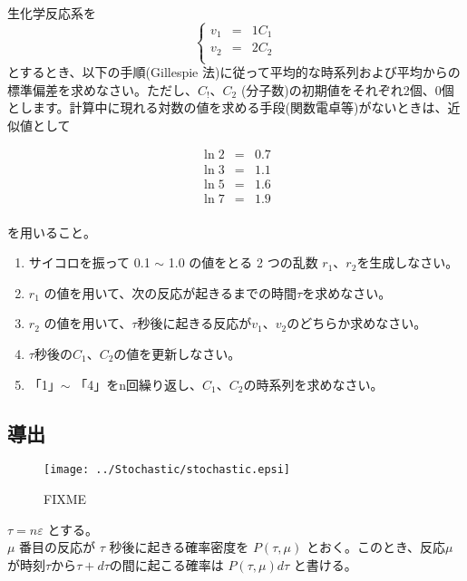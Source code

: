 生化学反応系を
\[\left\{
\begin{array}{lcl}
v_1 & = & 1 C_1 \\ 
v_2 & = & 2 C_2 \\ 
\end{array}
\right.\]
とするとき、以下の手順(Gillespie 法)に従って平均的な時系列および平均からの標準偏差を求めなさい。ただし、\(C_!\)、\(C_2\) (分子数)の初期値をそれぞれ2個、0個とします。計算中に現れる対数の値を求める手段(関数電卓等)がないときは、近似値として

\begin{eqnarray*}
\ln 2 & = & 0.7 \\
\ln 3 & = & 1.1 \\
\ln 5 & = & 1.6 \\
\ln 7 & = & 1.9 \\
\end{eqnarray*}

を用いること。

\begin{enumerate}
\item サイコロを振って 0.1 \(\sim\) 1.0 の値をとる 2 つの乱数 \(r_1\)、\(r_2\)を生成しなさい。
\item \(r_1\) の値を用いて、次の反応が起きるまでの時間\(\tau\)を求めなさい。
\item \(r_2\) の値を用いて、\(\tau\)秒後に起きる反応が\(v_1\)、\(v_2\)のどちらか求めなさい。
\item \(\tau\)秒後の\(C_1\)、\(C_2\)の値を更新しなさい。
\item 「1」\(\sim\) 「4」をn回繰り返し、\(C_1\)、\(C_2\)の時系列を求めなさい。

\end{enumerate}


\subsection{導出}
\begin{figure}[ht]
\centering
\texttt{[image: ../Stochastic/stochastic.epsi]}
\caption{FIXME}
\label{fig:stochastic1}
\end{figure}

$ \tau = n \varepsilon $ とする。\\

$\mu$ 番目の反応が $ \tau $ 秒後に起きる確率密度を $ P(\tau,\mu) $ とおく。このとき、反応$\mu$が時刻$\tau$から$\tau+d\tau$の間に起こる確率は $ P(\tau,\mu) d\tau $ と書ける。

